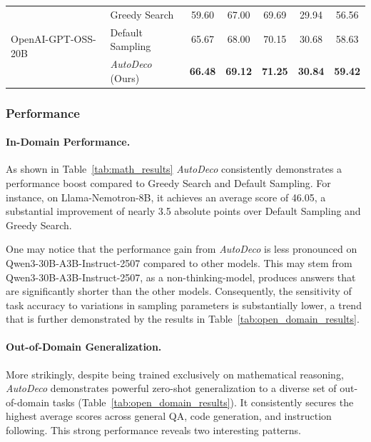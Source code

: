 \begin{table}[t!]
{\begin{tabular}{llccccc}
\midrule
\multirow{3}{*}{OpenAI-GPT-OSS-20B}
 & Greedy Search & 59.60 & 67.00 & 69.69 & 29.94 & 56.56 \\
 & Default Sampling & 65.67 & 68.00 & 70.15 & 30.68 & 58.63 \\
 & \textit{AutoDeco} (Ours) & \cellcolor{gray!25}\textbf{66.48} & \cellcolor{gray!25}\textbf{69.12} & \cellcolor{gray!25}\textbf{71.25} & \cellcolor{gray!25}\textbf{30.84} & \cellcolor{gray!25}\textbf{59.42} \\
\bottomrule
\end{tabular}%
}
\end{table}

\subsubsection{Performance}
\label{sec:performance}

\paragraph{In-Domain Performance.}
As shown in Table~\ref{tab:math_results} \textit{AutoDeco} consistently demonstrates a performance boost compared to Greedy Search and Default Sampling. For instance, on Llama-Nemotron-8B, it achieves an average score of 46.05, a substantial improvement of nearly 3.5 absolute points over Default Sampling and Greedy Search.

One may notice that the performance gain from \textit{AutoDeco} is less pronounced on Qwen3-30B-A3B-Instruct-2507 compared to other models. This may stem from Qwen3-30B-A3B-Instruct-2507, as a non-thinking-model, produces answers that are significantly shorter than the other models. Consequently, the sensitivity of task accuracy to variations in sampling parameters is substantially lower, a trend that is further demonstrated by the results in Table~\ref{tab:open_domain_results}.

\paragraph{Out-of-Domain Generalization.}
More strikingly, despite being trained exclusively on mathematical reasoning, \textit{AutoDeco} demonstrates powerful zero-shot generalization to a diverse set of out-of-domain tasks (Table~\ref{tab:open_domain_results}). It consistently secures the highest average scores across general QA, code generation, and instruction following. This strong performance reveals two interesting patterns.

